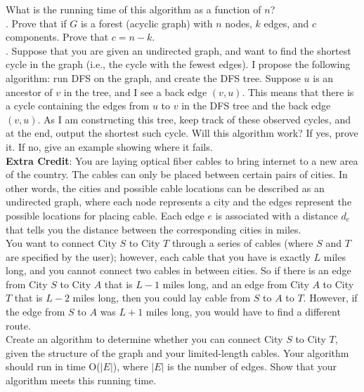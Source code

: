 \documentclass[12pt]{article}
\begin{document}
\noindent
What is the running time of this algorithm as a function of $n$?\\

.  Prove that if $G$ is a forest (acyclic graph) with $n$ nodes, $k$ edges, and $c$ components.  Prove that $c = n - k$. \\

.  Suppose that you are given an undirected graph, and want to find the shortest cycle in the graph (i.e., the cycle with the fewest edges).  I propose the following algorithm: run DFS on the graph, and create the DFS tree.  Suppose $u$ is an ancestor of $v$ in the tree, and I see a back edge $(v, u)$.  This means that there is a cycle containing the edges from $u$ to $v$ in the DFS tree and the back edge $(v, u)$.  As I am constructing this tree, keep track of these observed cycles, and at the end, output the shortest such cycle.  Will this algorithm work?  If yes, prove it.  If no, give an example showing where it fails.\\

\noindent
\textbf{Extra Credit}:  You are laying optical fiber cables to bring internet to a new area of the country.  The cables can only be placed between certain pairs of cities.  In other words, the cities and possible cable locations can be described as an undirected graph, where each node represents a city and the edges represent the possible locations for placing cable.   Each edge $e$ is associated with a distance $d_e$ that tells you the distance between the corresponding cities in miles.\\

\noindent
You want to connect City $S$ to City $T$ through a series of cables (where $S$ and $T$ are specified by the user); however, each cable that you have is exactly $L$ miles long, and you cannot connect two cables in between cities.  So if there is an edge from City $S$ to City $A$ that is $L - 1$ miles long, and an edge from City $A$ to City $T$ that is $L - 2$ miles long, then you could lay cable from $S$ to $A$ to $T$.  However, if the edge from $S$ to $A$ was $L + 1$ miles long, you would have to find a different route.\\

\noindent
Create an algorithm to determine whether you can connect City $S$ to City $T$, given the structure of the graph and your limited-length cables.  Your algorithm should run in time O($|E|$), where $|E|$ is the number of edges.  Show that your algorithm meets this running time.\\



 
\end{document}
